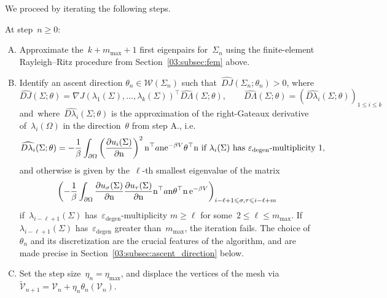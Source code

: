 We proceed by iterating the following steps.
\begin{algorithm}
\label{03:alg:ascent}
At step~$n\geq 0$:
\begin{enumerate}[A.]
    \item{Approximate the~$k+m_{\mathrm{max}}+1$ first eigenpairs for~$\Sigma_n$ using the finite-element Rayleigh--Ritz procedure from Section~\ref{03:subsec:fem} above.}
    \item{Identify an ascent direction $\theta_n\in \mathcal W(\Sigma_n)$ such that~$\widehat{DJ}(\Sigma_n;\theta_n)>0$, where
    \begin{equation}
        \label{03:eq:directional_derivative}
        \widehat{DJ}(\Sigma;\theta) = \nabla J(\lambda_1(\Sigma),\dots,\lambda_k(\Sigma))^\top \widehat{D\Lambda}(\Sigma;\theta),\qquad \widehat{D\Lambda}(\Sigma;\theta) = \left(\widehat{D\lambda_i}(\Sigma;\theta)\right)_{1\leq i\leq k}
    \end{equation}
    and~where~$\widehat{D\lambda_i}(\Sigma;\theta)$ is the approximation of the right-Gateaux derivative of~$\lambda_i(\Omega)$ in the direction~$\theta$ from step A., i.e.
    \begin{equation}
        \label{03:eq:directional_derivative_approx_simple}
        \widehat{D\lambda_i}(\Sigma;\theta) = 
            -\frac1\beta\int_{\partial\Omega} \left(\frac{\partial u_i(\Sigma)}{\partial\mathrm{n}}\right)^2 \mathrm{n}^\top a\mathrm{n} \mathrm{e}^{-\beta V}\theta^\top\mathrm{n} \text{ if }\lambda_i(\Sigma)\text{ has~$\varepsilon_{\mathrm{degen}}$-multiplicity } 1,
    \end{equation}
    and otherwise is given by the~$\ell$-th smallest eigenvalue of the matrix
    \begin{equation}
        \label{03:eq:directional_derivative_approx_multiple}
        \left(-\frac1\beta\int_{\partial\Omega} \frac{\partial u_\sigma(\Sigma)}{\partial\mathrm{n}}\frac{\partial u_\tau(\Sigma)}{\partial\mathrm{n}} \mathrm{n}^\top a\mathrm{n}\theta^\top\mathrm{n}\,\mathrm{e}^{-\beta V}\right)_{i-\ell+1\leqslant \sigma,\tau\leqslant i-\ell+m}
    \end{equation}
    if~$\lambda_{i-\ell+1}(\Sigma)$ has~$\varepsilon_{\mathrm{degen}}$-multiplicity $m\geq \ell$ for some~$2\leq\ell\leq m_{\max}$. If~$\lambda_{i-\ell+1}(\Sigma)$ has~$\varepsilon_{\mathrm{degen}}$ greater than~$m_{\max}$, the iteration fails. The choice of~$\theta_n$ and its discretization are the crucial features of the algorithm, and are made precise in Section~\ref{03:subsec:ascent_direction} below.}
    \item{Set the step size~$\eta_n =\eta_{\max}$, and displace the vertices of the mesh via~$\widetilde{ \mathcal V}_{n+1} = \mathcal{V}_n + \eta_n \theta_n(\mathcal V_n)$.
}
\end{enumerate}
\end{algorithm}
